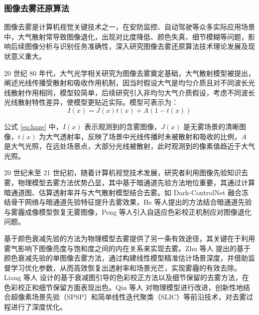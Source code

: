 \subsubsection{图像去雾还原算法}

图像去雾是计算机视觉关键技术之一，在安防监控、自动驾驶等众多实际应用场景中，大气散射常导致图像退化，出现对比度降低、颜色失真、细节模糊等问题，影响后续图像分析与识别任务准确性，深入研究图像去雾还原算法技术理论发展及现状意义重大。

20 世纪 80 年代，大气光学相关研究为图像去雾奠定基础，大气散射模型被提出，阐述光线传播受散射和吸收作用机制，因当时假设大气是均匀介质且对不同波长光线散射作用相同，模型较简单，后续研究引入非均匀大气介质假设，考虑不同波长光线散射特性差异，使模型更贴近实际。模型可表示为：
\begin{equation}
    \label{eq:haze}
    I(x) = J(x)t(x)+A(1-t(x))
\end{equation}

公式 \ref{eq:haze} 中，$I(x)$ 表示观测到的含雾图像，$J(x)$ 是无雾场景的清晰图像，$t(x)$ 为大气透射率，反映了场景中光线传播时未被散射和吸收的比例，$A$ 是大气光照，在远处场景点，大部分光线被散射，此时观测到的像素值趋近于大气光照。

20 世纪末至 21 世纪初，随着计算机视觉技术发展，研究者利用图像先验知识去雾，物理模型去雾方法优势凸显，其中基于暗通道先验方法地位重要，其通过计算暗通道图、估算透射率并与大气散射模型结合去雾。如 Dark-ControlNet \cite{Dark_ControlNet}融合冻结骨干网络与暗通道先验特征提升去雾效果，He 等人\cite{he2010single}提出的方法结合暗通道先验与雾霾成像模型恢复无雾图像，Peng 等人\cite{peng2018generalization}引入自适应色彩校正机制应对图像退化问题。

基于颜色衰减先验的方法为物理模型去雾提供了另一条有效途径，其关键在于利用雾气影响下图像亮度与饱和度之间的内在关系来实现去雾。Zhu 等人 \cite{zhu2015fast} 提出的基于颜色衰减先验的单图像去雾方法，通过构建线性模型精准估计场景深度，并借助监督学习优化参数，从而高效恢复出透射率和场景光芒，实现雾霾的有效去除。Liang 等人 \cite{liang2021single} 设计的基于衰减图引导的色彩校正方法以及细节保留的去雾方法，在色彩校正和细节保留方面表现出色。Qiu 等人 \cite{qiu2024perception} 对物理模型进行改进，创新性地结合超像素场景先验（SPSP）和简单线性迭代聚类（SLIC）等前沿技术，对去雾过程进行了深度优化。

